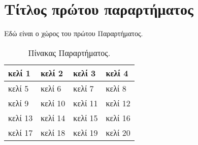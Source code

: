 \chapter{Τίτλος πρώτου παραρτήματος}
\label{app:FirstAppendix}

Εδώ είναι ο χώρος του πρώτου Παραρτήματος.

\begin{table}[h]
	\centering
	\caption{Πίνακας Παραρτήματος.}
	\label{tab:AppendixTable}
	\begin{tabular}{| l || l | l | l |}
		\hline
		κελί 1 & κελί 2 & κελί 3 & κελί 4\\
		\hline
		\hline
		κελί 5 & κελί 6 & κελί 7 & κελί 8\\
		\hline
		κελί 9 & κελί 10 & κελί 11 & κελί 12\\
		\hline
		κελί 13 & κελί 14 & κελί 15 & κελί 16\\
		\hline
		κελί 17 & κελί 18 & κελί 19 & κελί 20\\
		\hline
	\end{tabular}
\end{table}
